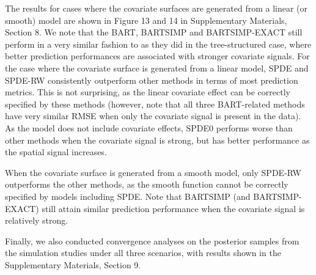 \documentclass[preprint,12pt,authoryear]{elsarticle}
\begin{document}
{{ The results for cases where the covariate surfaces are generated from a linear (or smooth) model are shown in Figure 13 and 14 in Supplementary Materials, Section 8. We note that the BART, BARTSIMP and BARTSIMP-EXACT still perform in a very similar fashion  to as they did in the  tree-structured case, where better prediction performances are associated with stronger covariate signals. For the case where the covariate surface is generated from a linear model, SPDE and SPDE-RW consistently outperform other methods in terms of most prediction metrics. This is not surprising, as the linear covariate effect can be correctly specified by these methods (however, note that all three BART-related methods have very similar RMSE when only the covariate signal is present in the data). As the model does not include covariate effects, SPDE0 performs worse than other methods when the covariate signal is strong, but has better performance as the spatial signal increases. 

When the covariate surface is generated from a smooth model, only SPDE-RW outperforms the other methods, as the smooth function cannot be correctly specified by models including SPDE. Note that BARTSIMP (and BARTSIMP-EXACT) still attain similar prediction performance when the covariate signal is relatively strong. 

Finally, we also conducted convergence analyses on the posterior samples from the simulation studies under all three scenarios, with results shown in the Supplementary Materials, Section 9.
}


}
\end{document}
